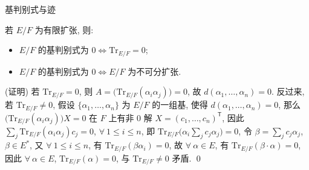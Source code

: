 
\begin{frame}{基判别式与迹}

\begin{lem}[基判别式与迹]
若 $E/F$ 为有限扩张, 则:
\begin{itemize}
\item[(i)] $E/F$ 的基判别式为 $0 \iff \mathrm{Tr}_{E/F} = 0$;
\item[(ii)] $E/F$ 的基判别式为 $0 \iff E/F$ 为不可分扩张.
\end{itemize}
\end{lem}

\startproof[bg=yellow, fg=red](证明)
若 $\mathrm{Tr}_{E/F} = 0$, 则 $A = \big( \mathrm{Tr}_{E/F}(\alpha_i \alpha_j) \big) = 0$,
故 $d(\alpha_1, \dots, \alpha_n) = 0$.
反过来, 若 $\mathrm{Tr}_{E/F} \neq 0$, 假设 $\{ \alpha_1, \dots, \alpha_n \}$
为 $E/F$ 的一组基, 使得 $d(\alpha_1, \dots, \alpha_n) = 0$,
那么 $\big( \mathrm{Tr}_{E/F}(\alpha_i \alpha_j) \big) X = 0$ 在 $F$ 上有非 0 解
$X = (c_1, \dots, c_n)^{\mathsf{T}}$,
因此 $\sum_{j} \mathrm{Tr}_{E/F}(\alpha_i \alpha_j) c_j = 0$, $\forall\ 1 \leq i \leq n$,
即 $\mathrm{Tr}_{E/F}\big( \alpha_i \sum_{j} c_j \alpha_j \big) = 0$,
令 $\beta = \sum_{j} c_j \alpha_j$, $\beta \in E^{*}$,
又 $\forall\ 1 \leq i \leq n$, 有 $\mathrm{Tr}_{E/F}(\beta \alpha_i) = 0$,
故 $\forall\ \alpha \in E$, 有 $\mathrm{Tr}_{E/F}(\beta \cdot \alpha) = 0$,
因此 $\forall\ \alpha \in E$, $\mathrm{Tr}_{E/F}(\alpha) = 0$,
与 $\mathrm{Tr}_{E/F} \neq 0$ 矛盾.
\qed

\end{frame}



